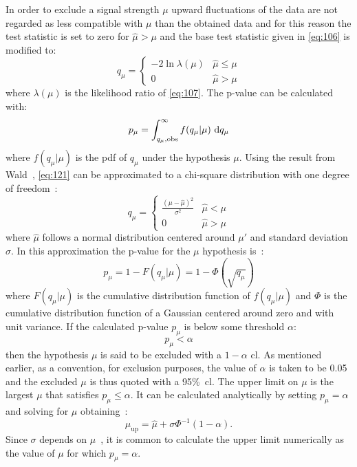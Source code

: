 In order to exclude a signal strength $\mu$ upward fluctuations of the data are
not regarded as less compatible with $\mu$ than the obtained data and for this
reason the test statistic is set to zero for $\hat{\mu} > \mu$ and the base test
statistic given in \cref{eq:106} is modified to:
\begin{equation}
  \label{eq:121}
  q_\mu =
  \left\{
    \begin{array}{lr}
      - 2 \ln \lambda(\mu)  & \hat{\mu} \leq \mu \\
      0 & \hat{\mu} > \mu
    \end{array}
    \right.
\end{equation}
where $\lambda(\mu)$ is the likelihood ratio of \cref{eq:107}. The p-value can
be calculated with:
\begin{equation}
  \label{eq:50}
  p_\mu = \int_{q_\mu, \mathrm{obs}}^\infty f(q_\mu | \mu)~\mathrm{d} q_\mu
\end{equation}
where $f(q_\mu | \mu)$ is the \gls{pdf} of $q_\mu$ under the hypothesis
$\mu$. Using the result from Wald~\cite{WaldApproximation}, \eqref{eq:121} can
be approximated to a chi-square distribution with one degree of
freedom~\cite{StatProcedure}:
\begin{equation}
  \label{eq:122}
  q_\mu =
  \left\{
    \begin{array}{lr}
      \frac{(\mu - \hat{\mu})^2}{\sigma^2}  & \hat{\mu} < \mu \\
      0 & \hat{\mu} > \mu
    \end{array}
    \right.
\end{equation}
where $\hat{\mu}$ follows a normal distribution centered around $\mu'$ and
standard deviation $\sigma$. In this approximation the p-value for the $\mu$
hypothesis is~\cite{StatProcedure}:
\begin{equation}
  \label{eq:123}
  p_\mu = 1 - F(q_\mu|\mu) = 1 - \Phi(\sqrt{q_\mu})
\end{equation}
where $F(q_\mu|\mu)$ is the cumulative distribution function of $f(q_\mu|\mu)$
and $\Phi$ is the cumulative distribution function of a Gaussian centered around
zero and with unit variance. If the calculated p-value $p_\mu$ is below some
threshold $\alpha$:
\begin{equation}
  \label{eq:124}
  p_\mu < \alpha
\end{equation}
then the hypothesis $\mu$ is said to be excluded with a $1 - \alpha$
\gls{cl}. As mentioned earlier, as a convention, for exclusion purposes, the
value of $\alpha$ is taken to be 0.05 and the excluded $\mu$ is thus quoted with
a 95\%~\gls{cl}. The upper limit on $\mu$ is the largest $\mu$ that satisfies
$p_\mu \leq \alpha$. It can be calculated analytically by setting $p_\mu =
\alpha$ and solving for $\mu$ obtaining~\cite{StatProcedure}:
\begin{equation}
  \label{eq:125}
  \mu_{\mathrm{up}} = \hat{\mu} + \sigma \Phi^{-1}(1 - \alpha).
\end{equation}
Since $\sigma$ depends on $\mu$~\cite{StatProcedure}, it is common to calculate
the upper limit numerically as the value of $\mu$ for which $p_\mu = \alpha$.
